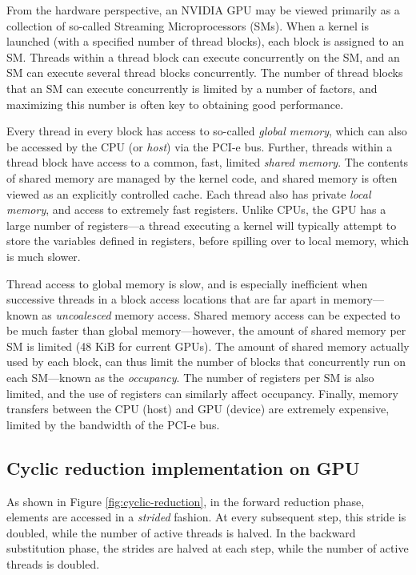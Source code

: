 \documentclass{elsarticle}
\begin{document}
From the hardware perspective, an NVIDIA GPU may be viewed primarily as
a collection of so-called Streaming Microprocessors (SMs).
When a kernel is launched (with a specified number of thread blocks),
each block is assigned to an SM.
Threads within a thread block can execute concurrently on the SM,
and an SM can execute several thread blocks concurrently.
The number of thread blocks that an SM can execute concurrently
is limited by a number of factors,
and maximizing this number is often key to obtaining good performance.

Every thread in every block has access to so-called \emph{global memory},
which can also be accessed by the CPU (or \emph{host}) via the PCI-e bus.
Further,
threads within a thread block have access
to a common, fast, limited \emph{shared memory}.
The contents of shared memory are managed by the kernel code,
and shared memory is often viewed as an explicitly controlled cache.
Each thread also has private \emph{local memory},
and access to extremely fast registers.
Unlike CPUs, the GPU has a large number of registers---a
thread executing a kernel will
typically attempt to store the variables defined in registers,
before spilling over to local memory, which is much slower.

Thread access to global memory is slow,
and is especially inefficient when
successive threads in a block
access locations that are far apart in memory---known
as \emph{uncoalesced} memory access.
Shared memory access can be expected to be
much faster than global memory---however,
the amount of shared memory per SM is limited
(48 KiB for current GPUs).
The amount of shared memory actually used by each block,
can thus limit the number of blocks that
concurrently run on each SM---known as the \emph{occupancy}.
The number of registers per SM is also limited,
and the use of registers can similarly affect occupancy.
Finally, memory transfers between the CPU (host) and GPU (device)
are extremely expensive, limited by the bandwidth of the PCI-e bus.

\subsection{Cyclic reduction implementation on GPU}

As shown in Figure \ref{fig:cyclic-reduction},
in the forward reduction phase,
elements are accessed in a \emph{strided} fashion.
At every subsequent step,
this stride is doubled, while the number of active threads is halved.
In the backward substitution phase,
the strides are halved at each step,
while the number of active threads is doubled.
\end{document}
